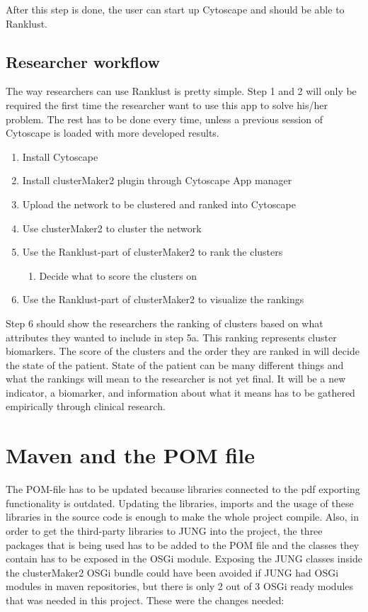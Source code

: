 After this step is done, the user can start up Cytoscape and should be able to
Ranklust.

\subsection{Researcher workflow}
The way researchers can use Ranklust is pretty simple. Step 1 and 2 will only be
required the first time the researcher want to use this app to solve his/her
problem. The rest has to be done every time, unless a previous session of
Cytoscape is loaded with more developed results.

\begin{enumerate}
    \item Install Cytoscape
    \item Install clusterMaker2 plugin through Cytoscape App manager
    \item Upload the network to be clustered and ranked into Cytoscape
    \item Use clusterMaker2 to cluster the network
    \item Use the Ranklust-part of clusterMaker2 to rank the clusters
        \begin{enumerate}
            \item Decide what to score the clusters on
        \end{enumerate}
    \item Use the Ranklust-part of clusterMaker2 to visualize the rankings
\end{enumerate}

Step 6 should show the researchers the ranking of clusters based on what
attributes they wanted to include in step 5a. This ranking represents cluster
biomarkers. The score of the clusters and the order they are ranked in will
decide the state of the patient. State of the patient can be many different
things and what the rankings will mean to the researcher is not yet final. It
will be a new indicator, a biomarker, and information about what it means has to
be gathered empirically through clinical research.

\section{Maven and the POM file}
The POM-file has to be updated because libraries connected to the pdf exporting
functionality is outdated. Updating the libraries, imports and the usage of
these libraries in the source code is enough to make the whole project compile.
Also, in order to get the third-party libraries to JUNG\cite{jung} into the
project, the three packages that is being used has to be added to the POM file
and the classes they contain has to be exposed in the OSGi
module\cite{osgi-felix}. Exposing the JUNG classes inside the clusterMaker2 OSGi
bundle could have been avoided if JUNG had OSGi modules in maven repositories,
but there is only 2 out of 3 OSGi ready modules that was needed in this project.
These were the changes needed:


